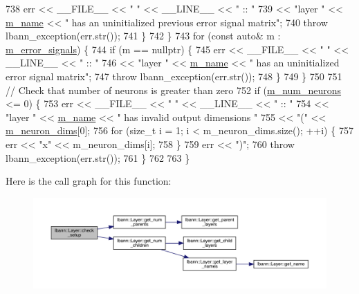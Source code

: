\begin{DoxyCode}
738       err << \_\_FILE\_\_ << \textcolor{stringliteral}{" "} << \_\_LINE\_\_ << \textcolor{stringliteral}{" :: "}
739           << \textcolor{stringliteral}{"layer "} << \hyperlink{classlbann_1_1Layer_aa47109ad09b399142fa92f9d3702189f}{m\_name} << \textcolor{stringliteral}{" has an uninitialized previous error signal matrix"};
740       \textcolor{keywordflow}{throw} lbann\_exception(err.str());
741     \}
742   \}
743   \textcolor{keywordflow}{for} (\textcolor{keyword}{const} \textcolor{keyword}{auto}& m : \hyperlink{classlbann_1_1Layer_a452e22ac81c1a799f0614b3e942ea726}{m\_error\_signals}) \{
744     \textcolor{keywordflow}{if} (m == \textcolor{keyword}{nullptr}) \{
745       err << \_\_FILE\_\_ << \textcolor{stringliteral}{" "} << \_\_LINE\_\_ << \textcolor{stringliteral}{" :: "}
746           << \textcolor{stringliteral}{"layer "} << \hyperlink{classlbann_1_1Layer_aa47109ad09b399142fa92f9d3702189f}{m\_name} << \textcolor{stringliteral}{" has an uninitialized error signal matrix"};
747       \textcolor{keywordflow}{throw} lbann\_exception(err.str());
748     \}
749   \}
750 
751   \textcolor{comment}{// Check that number of neurons is greater than zero}
752   \textcolor{keywordflow}{if} (\hyperlink{classlbann_1_1Layer_a6b5ebc8a7d9329d8a773ed787e7b41d8}{m\_num\_neurons} <= 0) \{
753     err << \_\_FILE\_\_ << \textcolor{stringliteral}{" "} << \_\_LINE\_\_ << \textcolor{stringliteral}{" :: "}
754         << \textcolor{stringliteral}{"layer "} << \hyperlink{classlbann_1_1Layer_aa47109ad09b399142fa92f9d3702189f}{m\_name} << \textcolor{stringliteral}{" has invalid output dimensions "}
755         << \textcolor{stringliteral}{"("} << \hyperlink{classlbann_1_1Layer_abb34bb8031f57a483e2e327a5f229f48}{m\_neuron\_dims}[0];
756     \textcolor{keywordflow}{for} (\textcolor{keywordtype}{size\_t} i = 1; i < m\_neuron\_dims.size(); ++i) \{
757       err << \textcolor{stringliteral}{"x"} << m\_neuron\_dims[i];
758     \}
759     err << \textcolor{stringliteral}{")"};
760     \textcolor{keywordflow}{throw} lbann\_exception(err.str());
761   \}
762 
763 \}
\end{DoxyCode}
Here is the call graph for this function\+:\nopagebreak
\begin{figure}[H]
\begin{center}
\leavevmode
\includegraphics[width=350pt]{classlbann_1_1Layer_aeec1c710c3d53b5e43a4d4f67b0a21b2_cgraph}
\end{center}
\end{figure}
